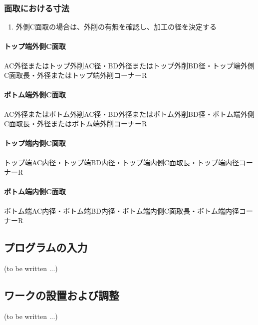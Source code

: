 \subsubsection{面取における寸法}
\begin{enumerate}
\item 外側C面取の場合は、外削の有無を確認し、加工の径を決定する
\end{enumerate}
\begin{Tabbox}[title={必要な図面上のパラメタ}]\small
\paragraph*{トップ端外側C面取}
AC外径またはトップ外削AC径・BD外径またはトップ外削BD径・トップ端外側C面取長・外径またはトップ端外削コーナーR
\tcbline*
\paragraph*{ボトム端外側C面取}
AC外径またはボトム外削AC径・BD外径またはボトム外削BD径・ボトム端外側C面取長・外径またはボトム端外削コーナーR
\tcbline*
\paragraph*{トップ端内側C面取}
トップ端AC内径・トップ端BD内径・トップ端内側C面取長・トップ端内径コーナーR
\tcbline*
\paragraph*{ボトム端内側C面取}
ボトム端AC内径・ボトム端BD内径・ボトム端内側C面取長・ボトム端内径コーナーR
\end{Tabbox}


\clearpage
\subsection{プログラムの入力\TBW}
(to be written ...)


\subsection{ワークの設置および調整\TBW}
(to be written ...)




